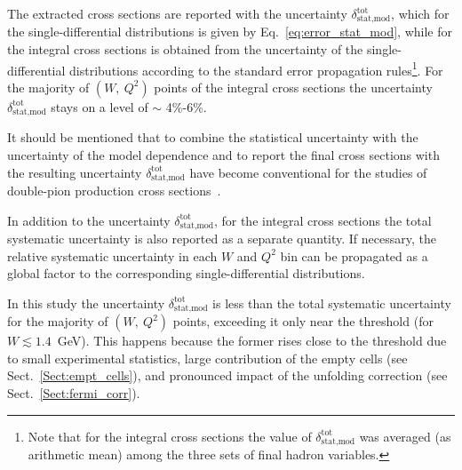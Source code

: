 The extracted cross sections are reported with the uncertainty $\delta_{\text{stat,mod}}^{\text{tot}}$, which for the single-differential distributions is given by Eq.~\eqref{eq:error_stat_mod}, while for the integral cross sections is obtained from the uncertainty of the single-differential distributions according to the standard error propagation rules\footnote[6]{Note that for the integral cross sections the value of $\delta_{\text{stat,mod}}^{\text{tot}}$ was averaged (as arithmetic mean) among the three sets of final hadron variables.}. For the majority of $(W,~Q^{2})$ points of the integral cross sections the uncertainty $\delta_{\text{stat,mod}}^{\text{tot}}$ stays on a level of $\sim$ 4\%-6\%.


It should be mentioned that to combine the statistical uncertainty with the uncertainty of the model dependence and to report the final cross sections with the resulting uncertainty $\delta_{\text{stat,mod}}^{\text{tot}}$ have become conventional for the studies of double-pion production cross sections~\cite{Rip_an_note:2002,Ripani:2002ss,Fed_an_note:2007,Fedotov:2008aa,Isupov:2017lnd,Arjun,Fed_an_note:2017,Fed_paper_2018}.


In addition to the uncertainty $\delta_{\text{stat,mod}}^{\text{tot}}$, for the integral cross sections the total systematic uncertainty is also reported as a separate quantity. If necessary, the relative systematic uncertainty in each $W$ and $Q^{2}$ bin can be propagated as a global factor to the corresponding single-differential distributions.


In this study the uncertainty $\delta_{\text{stat,mod}}^{\text{tot}}$ is less than the total systematic uncertainty for the majority of $(W,~Q^{2})$ points, exceeding it only near the threshold (for $W \lesssim 1.4$~GeV). This happens because the former rises close to the threshold due to small experimental statistics, large contribution of the empty cells (see Sect.~\ref{Sect:empt_cells}), and pronounced impact of the unfolding correction (see Sect.~\ref{Sect:fermi_corr}). 
